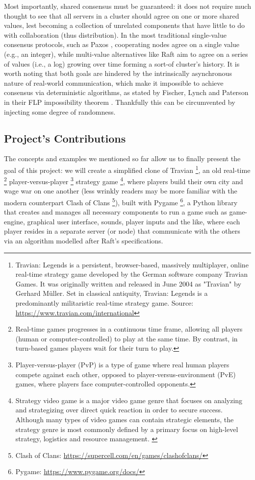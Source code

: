 Most importantly, shared consensus must be guaranteed: it does not require much thought to see that all servers in a cluster should agree on one or more shared values, lest becoming a collection of unrelated components that have little to do with collaboration (thus distribution). In the most traditional single-value consensus protocols, such as Paxos \cite{paxos}, cooperating nodes agree on a single value (e.g., an integer), while multi-value alternatives like Raft \cite{raft} aim to agree on a series of values (i.e., a log) growing over time forming a sort-of cluster's history. It is worth noting that both goals are hindered by the intrinsically asynchronous nature of real-world communication, which make it impossible to achieve consensus via deterministic algorithms, as stated by Fischer, Lynch and Paterson in their FLP impossibility theorem \cite{flp}. Thankfully this can be circumvented by injecting some degree of randomness.

\subsection{Project's Contributions}

The concepts and examples we mentioned so far allow us to finally present the goal of this project: we will create a simplified clone of Travian \footnote{Travian: Legends is a persistent, browser-based, massively multiplayer, online real-time strategy game developed by the German software company Travian Games. It was originally written and released in June 2004 as "Travian" by Gerhard Müller. Set in classical antiquity, Travian: Legends is a predominantly militaristic real-time strategy game. Source: \url{https://www.travian.com/international}}, an old real-time \footnote{Real-time games progresses in a continuous time frame, allowing all players (human or computer-controlled) to play at the same time. By contrast, in turn-based games players wait for their turn to play.} player-versus-player \footnote{Player-versus-player (PvP) is a type of game where real human players compete against each other, opposed to player-versus-environment (PvE) games, where players face computer-controlled opponents.} strategy game \footnote{Strategy video game is a major video game genre that focuses on analyzing and strategizing over direct quick reaction in order to secure success. Although many types of video games can contain strategic elements, the strategy genre is most commonly defined by a primary focus on high-level strategy, logistics and resource management. \cite{rollings2003andrew}}, where players build their own city and wage war on one another (less wrinkly readers may be more familiar with the modern counterpart Clash of Clans \footnote{Clash of Clans: \url{https://supercell.com/en/games/clashofclans/}}), built with Pygame \footnote{Pygame: \url{https://www.pygame.org/docs/}}, a Python library that creates and manages all necessary components to run a game such as game-engine, graphical user interface, sounds, player inputs and the like, where each player resides in a separate server (or node) that communicate with the others via an algorithm modelled after Raft's specifications. 

